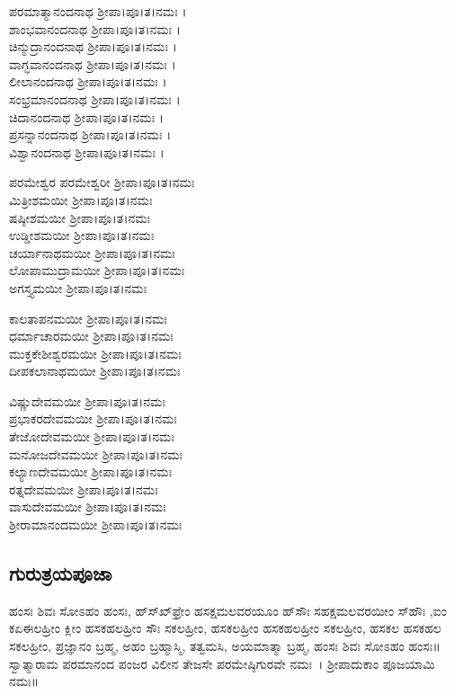  ಪರಮಾತ್ಮಾನಂದನಾಥ ಶ್ರೀಪಾ।ಪೂ।ತ।ನಮಃ ।\\
 ಶಾಂಭವಾನಂದನಾಥ ಶ್ರೀಪಾ।ಪೂ।ತ।ನಮಃ ।\\
 ಚಿನ್ಮುದ್ರಾನಂದನಾಥ ಶ್ರೀಪಾ।ಪೂ।ತ।ನಮಃ ।\\
 ವಾಗ್ಭವಾನಂದನಾಥ ಶ್ರೀಪಾ।ಪೂ।ತ।ನಮಃ ।\\
 ಲೀಲಾನಂದನಾಥ ಶ್ರೀಪಾ।ಪೂ।ತ।ನಮಃ ।\\
 ಸಂಭ್ರಮಾನಂದನಾಥ ಶ್ರೀಪಾ।ಪೂ।ತ।ನಮಃ ।\\
 ಚಿದಾನಂದನಾಥ ಶ್ರೀಪಾ।ಪೂ।ತ।ನಮಃ ।\\
 ಪ್ರಸನ್ನಾನಂದನಾಥ ಶ್ರೀಪಾ।ಪೂ।ತ।ನಮಃ ।\\
 ವಿಶ್ವಾನಂದನಾಥ ಶ್ರೀಪಾ।ಪೂ।ತ।ನಮಃ ।

 ಪರಮೇಶ್ವರ ಪರಮೇಶ್ವರೀ ಶ್ರೀಪಾ।ಪೂ।ತ।ನಮಃ\\
 ಮಿತ್ರೀಶಮಯೀ ಶ್ರೀಪಾ।ಪೂ।ತ।ನಮಃ\\
 ಷಷ್ಠೀಶಮಯೀ ಶ್ರೀಪಾ।ಪೂ।ತ।ನಮಃ\\
 ಉಡ್ಡೀಶಮಯೀ ಶ್ರೀಪಾ।ಪೂ।ತ।ನಮಃ\\
 ಚರ್ಯಾನಾಥಮಯೀ ಶ್ರೀಪಾ।ಪೂ।ತ।ನಮಃ\\
 ಲೋಪಾಮುದ್ರಾಮಯೀ ಶ್ರೀಪಾ।ಪೂ।ತ।ನಮಃ\\
 ಅಗಸ್ತ್ಯಮಯೀ ಶ್ರೀಪಾ।ಪೂ।ತ।ನಮಃ

 ಕಾಲತಾಪನಮಯೀ ಶ್ರೀಪಾ।ಪೂ।ತ।ನಮಃ\\
 ಧರ್ಮಾಚಾರಮಯೀ ಶ್ರೀಪಾ।ಪೂ।ತ।ನಮಃ\\
 ಮುಕ್ತಕೇಶೀಶ್ವರಮಯೀ ಶ್ರೀಪಾ।ಪೂ।ತ।ನಮಃ\\
 ದೀಪಕಲಾನಾಥಮಯೀ ಶ್ರೀಪಾ।ಪೂ।ತ।ನಮಃ

 ವಿಷ್ಣುದೇವಮಯೀ ಶ್ರೀಪಾ।ಪೂ।ತ।ನಮಃ\\
 ಪ್ರಭಾಕರದೇವಮಯೀ ಶ್ರೀಪಾ।ಪೂ।ತ।ನಮಃ\\
 ತೇಜೋದೇವಮಯೀ ಶ್ರೀಪಾ।ಪೂ।ತ।ನಮಃ\\
 ಮನೋಜದೇವಮಯೀ ಶ್ರೀಪಾ।ಪೂ।ತ।ನಮಃ\\
 ಕಲ್ಯಾಣದೇವಮಯೀ ಶ್ರೀಪಾ।ಪೂ।ತ।ನಮಃ\\
 ರತ್ನದೇವಮಯೀ ಶ್ರೀಪಾ।ಪೂ।ತ।ನಮಃ\\
 ವಾಸುದೇವಮಯೀ ಶ್ರೀಪಾ।ಪೂ।ತ।ನಮಃ\\
 ಶ್ರೀರಾಮಾನಂದಮಯೀ ಶ್ರೀಪಾ।ಪೂ।ತ।ನಮಃ

\subsection{ಗುರುತ್ರಯಪೂಜಾ}
 ಹಂಸಃ ಶಿವಃ ಸೋಽಹಂ ಹಂಸಃ, ಹ್‌ಸ್‌ಖ್‌ಫ್ರೇಂ ಹಸಕ್ಷಮಲವರಯೂಂ ಹ್‌ಸೌಃ ಸಹಕ್ಷಮಲವರಯೀಂ ಸ್‌ಹೌಃ ,ಐಂ ಕಏಈಲಹ್ರೀಂ ಕ್ಲೀಂ ಹಸಕಹಲಹ್ರೀಂ ಸೌಃ  ಸಕಲಹ್ರೀಂ, ಹಸಕಲಹ್ರೀಂ ಹಸಕಹಲಹ್ರೀಂ ಸಕಲಹ್ರೀಂ, ಹಸಕಲ ಹಸಕಹಲ ಸಕಲಹ್ರೀಂ, ಪ್ರಜ್ಞಾನಂ ಬ್ರಹ್ಮ, ಅಹಂ ಬ್ರಹ್ಮಾಸ್ಮಿ, ತತ್ವಮಸಿ, ಅಯಮಾತ್ಮಾ ಬ್ರಹ್ಮ, ಹಂಸಃ ಶಿವಃ ಸೋಽಹಂ ಹಂಸಃ॥ ಸ್ವಾತ್ಮಾರಾಮ ಪರಮಾನಂದ ಪಂಜರ ವಿಲೀನ ತೇಜಸೇ ಪರಮೇಷ್ಠಿಗುರವೇ ನಮಃ~। ಶ್ರೀಪಾದುಕಾಂ ಪೂಜಯಾಮಿ ನಮಃ॥

